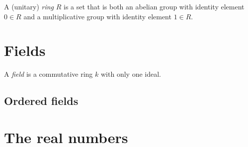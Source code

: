 \documentclass[11pt, norsk]{book}
\begin{document}
\begin{defi}
A (unitary) \emph{ring} $R$ is a set that is both an abelian group with identity element $0 \in R$ and a multiplicative group with identity element $1 \in R$. 
\end{defi}

\chapter{Fields}

\begin{defi}
 A \emph{field} is a commutative ring $k$ with only one ideal.
\end{defi}

\section{Ordered fields}

\chapter{The real numbers}
\end{document}
